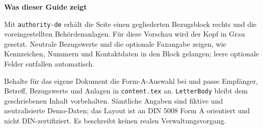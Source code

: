 
\SetColorGray
\UseHeaderColorBlocktrue

\UseRecipientManual
{}

\renewcommand{\SenderFax}{+49 000 0000001}

\begin{LetterBody}

\textbf{Was dieser Guide zeigt}

Mit \texttt{authority-de} erhält die Seite einen gegliederten Bezugsblock rechts und die voreingestellten Behördenanlagen. Für diese Vorschau wird der Kopf in Grau gesetzt. Neutrale Bezugswerte und die optionale Faxangabe zeigen, wie Kennzeichen, Nummern und Kontaktdaten in den Block gelangen; leere optionale Felder entfallen automatisch.

Behalte für das eigene Dokument die Form-A-Auswahl bei und passe Empfänger, Betreff, Bezugswerte und Anlagen in \texttt{content.tex} an. \texttt{LetterBody} bleibt dem geschriebenen Inhalt vorbehalten. Sämtliche Angaben sind fiktive und neutralisierte Demo-Daten; das Layout ist an DIN 5008 Form A orientiert und nicht DIN-zertifiziert. Es beschreibt keinen realen Verwaltungsvorgang.

\end{LetterBody}
